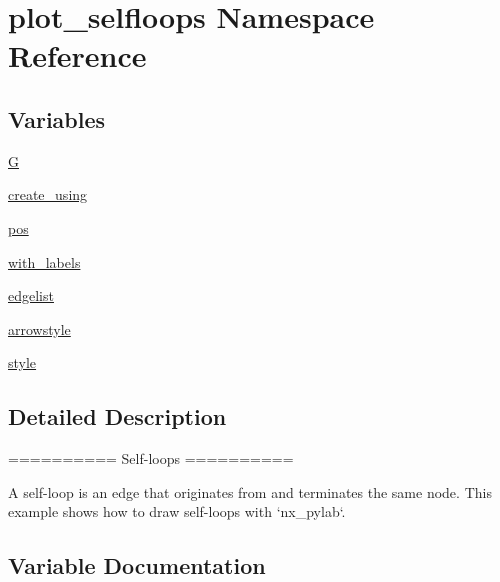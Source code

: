 \hypertarget{namespaceplot__selfloops}{}\section{plot\+\_\+selfloops Namespace Reference}
\label{namespaceplot__selfloops}
\subsection*{Variables}
\begin{DoxyCompactItemize}
\item 
\hyperlink{namespaceplot__selfloops_a119e18078cb2f7ea4b972314ed815d33}{G}
\item 
\hyperlink{namespaceplot__selfloops_a65c9ab70e21a8ef605fab79c58b2ff1a}{create\+\_\+using}
\item 
\hyperlink{namespaceplot__selfloops_a5fa2f8a5c53fb83a2d439e747d5621c4}{pos}
\item 
\hyperlink{namespaceplot__selfloops_a84a7d4ffbc5bddb6d8f3e2f296771706}{with\+\_\+labels}
\item 
\hyperlink{namespaceplot__selfloops_a7d73fc1abef5a7dccfb1cebf4285b5ca}{edgelist}
\item 
\hyperlink{namespaceplot__selfloops_a2e3e340484d55716dfb66b53deed2469}{arrowstyle}
\item 
\hyperlink{namespaceplot__selfloops_a5d5321be62bca470d5b6ac14989de379}{style}
\end{DoxyCompactItemize}


\subsection{Detailed Description}
\begin{DoxyVerb}==========
Self-loops
==========

A self-loop is an edge that originates from and terminates the same node.
This example shows how to draw self-loops with `nx_pylab`.\end{DoxyVerb}
 

\subsection{Variable Documentation}
\mbox{\label{namespaceplot__selfloops_a2e3e340484d55716dfb66b53deed2469}} 

